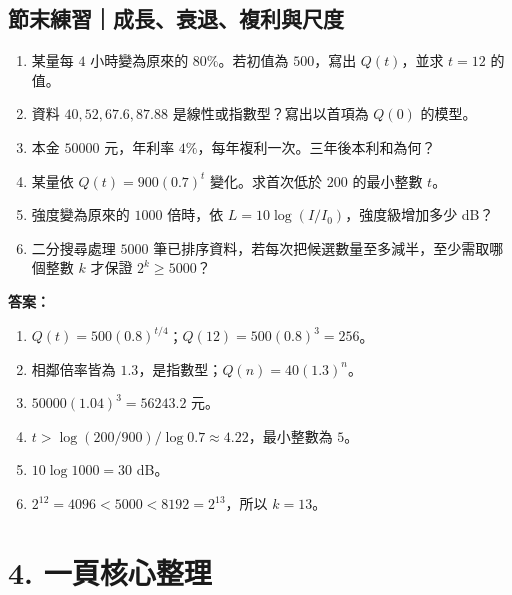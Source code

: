 \documentclass[11pt,a4paper]{article}
\providecommand{\tightlist}{%
  \setlength{\itemsep}{0pt}\setlength{\parskip}{0pt}}
\begin{document}
\begin{HandoutSelfCheck}

\subsection{節末練習｜成長、衰退、複利與尺度}\label{ux7bc0ux672bux7df4ux7fd2ux6210ux9577ux8870ux9000ux8907ux5229ux8207ux5c3aux5ea6}

\begin{enumerate}
\def\labelenumi{\arabic{enumi}.}
\tightlist
\item
  某量每 \(4\) 小時變為原來的 \(80\%\)。若初值為 \(500\)，寫出 \(Q(t)\)，並求 \(t=12\) 的值。
\item
  資料 \(40,52,67.6,87.88\) 是線性或指數型？寫出以首項為 \(Q(0)\) 的模型。
\item
  本金 \(50000\) 元，年利率 \(4\%\)，每年複利一次。三年後本利和為何？
\item
  某量依 \(Q(t)=900(0.7)^t\) 變化。求首次低於 \(200\) 的最小整數 \(t\)。
\item
  強度變為原來的 \(1000\) 倍時，依 \(L=10\log(I/I_0)\)，強度級增加多少 dB？
\item
  二分搜尋處理 \(5000\) 筆已排序資料，若每次把候選數量至多減半，至少需取哪個整數 \(k\) 才保證 \(2^k\ge5000\)？
\end{enumerate}

\textbf{答案：}

\begin{enumerate}
\def\labelenumi{\arabic{enumi}.}
\tightlist
\item
  \(Q(t)=500(0.8)^{t/4}\)；\(Q(12)=500(0.8)^3=256\)。
\item
  相鄰倍率皆為 \(1.3\)，是指數型；\(Q(n)=40(1.3)^n\)。
\item
  \(50000(1.04)^3=56243.2\) 元。
\item
  \(t>\log(200/900)/\log0.7\approx4.22\)，最小整數為 \(5\)。
\item
  \(10\log1000=30\) dB。
\item
  \(2^{12}=4096<5000<8192=2^{13}\)，所以 \(k=13\)。
\end{enumerate}

\end{HandoutSelfCheck}

\section{4. 一頁核心整理}\label{ux4e00ux9801ux6838ux5fc3ux6574ux7406}
\end{document}
